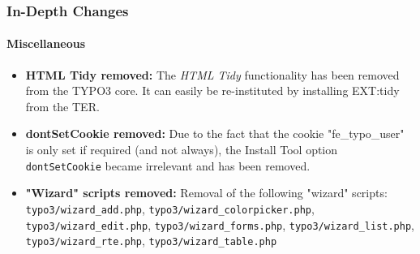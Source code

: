 \begin{frame}[fragile]
	\frametitle{In-Depth Changes}
	\framesubtitle{Miscellaneous}

	\begin{itemize}

		\item \textbf{HTML Tidy removed:}\newline
			\small
				The \textit{HTML Tidy} functionality has been removed from the TYPO3 core. It can easily be re-instituted by installing EXT:tidy from the TER.
			\normalsize

		\item \textbf{dontSetCookie removed:}\newline
			\small
				Due to the fact that the cookie "fe\_typo\_user" is only set if required (and not always), the Install Tool option \texttt{dontSetCookie} became irrelevant and has been removed.
			\normalsize

		\item \textbf{"Wizard" scripts removed:}\newline
			\small
				Removal of the following "wizard" scripts:
				\texttt{typo3/wizard\_add.php}, \texttt{typo3/wizard\_colorpicker.php}, \texttt{typo3/wizard\_edit.php}, \texttt{typo3/wizard\_forms.php}, \texttt{typo3/wizard\_list.php}, \texttt{typo3/wizard\_rte.php}, \texttt{typo3/wizard\_table.php}
			\normalsize

	\end{itemize}
	
\end{frame}


